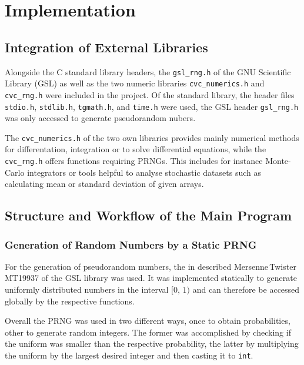 \section{Implementation}

\subsection{Integration of External Libraries}

Alongside the C standard library headers, the \texttt{gsl\_rng.h} of the GNU Scientific Library (GSL) as well as the two numeric libraries \texttt{cvc\_numerics.h} and \texttt{cvc\_rng.h} were included in the project. 
Of the standard library, the header files \texttt{stdio.h}, \texttt{stdlib.h}, \texttt{tgmath.h}, and \texttt{time.h} were used, the GSL header \texttt{gsl\_rng.h} was only accessed to generate pseudorandom nubers. 

The \texttt{cvc\_numerics.h} of the two own libraries provides mainly numerical methods for differentation, integration or to solve differential equations, while the \texttt{cvc\_rng.h} offers functions requiring PRNGs.
This includes for instance Monte-Carlo integrators or tools helpful to analyse stochastic datasets such as calculating mean or standard deviation of given arrays.


\subsection{Structure and Workflow of the Main Program}

\subsubsection{Generation of Random Numbers by a Static PRNG}

For the generation of pseudorandom numbers, the in  described Mer\-sen\-ne\,Twis\-ter MT19937 of the GSL library was used. It was implemented statically 
to generate uniformly distributed numbers in the interval $[0,\,1)$ and can therefore be accessed globally by the respective functions. 

Overall the PRNG was used in two different ways, once to obtain probabilities, other to generate random integers.
The former was accomplished by checking if the uniform was smaller than the respective probability, the latter by multiplying the uniform by the largest desired integer and then casting it to \texttt{int}.


